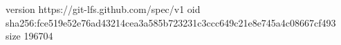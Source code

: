 version https://git-lfs.github.com/spec/v1
oid sha256:fce519e52e76ad43214cea3a585b723231c3ccc649c21e8e745a4c08667cf493
size 196704
